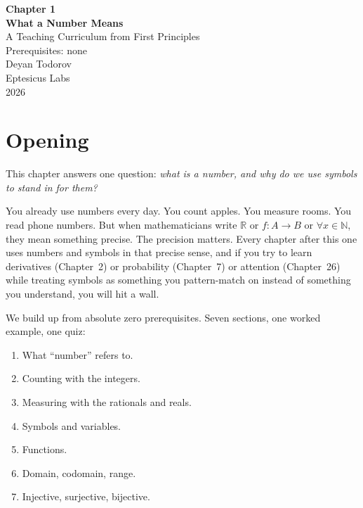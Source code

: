 \def\curriculumtitle{Chapter 1: What a Number Means}





\thispagestyle{empty}
\vspace*{5cm}
\begin{center}
{\Huge\bfseries Chapter 1}\\[0.4cm]
{\Huge\bfseries What a Number Means}\\[1.5cm]
{\Large A Teaching Curriculum from First Principles}\\[0.4cm]
{\normalsize Prerequisites: none}\\[2cm]
{\large Deyan Todorov}\\[0.2cm]
{\large Eptesicus Labs}\\[1.5cm]
{\normalsize 2026}
\end{center}
\newpage


\section*{Opening}

This chapter answers one question: \textit{what is a number, and why do we use symbols to stand in for them?}

You already use numbers every day. You count apples. You measure rooms. You read phone numbers. But when mathematicians write $\mathbb{R}$ or $f : A \to B$ or $\forall x \in \mathbb{N}$, they mean something precise. The precision matters. Every chapter after this one uses numbers and symbols in that precise sense, and if you try to learn derivatives (Chapter~2) or probability (Chapter~7) or attention (Chapter~26) while treating symbols as something you pattern-match on instead of something you understand, you will hit a wall.

We build up from absolute zero prerequisites. Seven sections, one worked example, one quiz:

\begin{enumerate}
  \item What ``number'' refers to.
  \item Counting with the integers.
  \item Measuring with the rationals and reals.
  \item Symbols and variables.
  \item Functions.
  \item Domain, codomain, range.
  \item Injective, surjective, bijective.
\end{enumerate}

